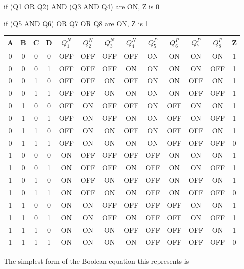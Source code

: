 \documentclass{article}
\begin{document}
\begin{center}
    if (Q1 OR Q2) AND (Q3 AND Q4) are ON, Z is 0
    
    if (Q5 AND Q6) OR Q7 OR Q8 are ON, Z is 1
    
    \vspace{3mm}
    
    \begin{tabular}{c|c|c|c|c|c|c|c|c|c|c|c|c}
        A & B & C & D & $Q_1^N$ & $Q_2^N$ & $Q_3^N$ & $Q_4^N$ & $Q_5^P$ & $Q_6^P$ & $Q_7^P$ & $Q_8^P$ & Z\\ 
        \hline
         0 & 0 & 0 & 0 & OFF & OFF & OFF & OFF & ON  & ON  & ON  & ON  & 1\\
         0 & 0 & 0 & 1 & OFF & OFF & OFF & ON  & ON  & ON  & ON  & OFF & 1\\
         0 & 0 & 1 & 0 & OFF & OFF & ON  & OFF & ON  & ON  & OFF & ON  & 1\\
         0 & 0 & 1 & 1 & OFF & OFF & ON  & ON  & ON  & ON  & OFF & OFF & 1\\
         0 & 1 & 0 & 0 & OFF & ON  & OFF & OFF & ON  & OFF & ON  & ON  & 1\\
         0 & 1 & 0 & 1 & OFF & ON  & OFF & ON  & ON  & OFF & ON  & OFF & 1\\
         0 & 1 & 1 & 0 & OFF & ON  & ON  & OFF & ON  & OFF & OFF & ON  & 1\\
         0 & 1 & 1 & 1 & OFF & ON  & ON  & ON  & ON  & OFF & OFF & OFF & 0\\
         1 & 0 & 0 & 0 & ON  & OFF & OFF & OFF & OFF & ON  & ON  & ON  & 1\\
         1 & 0 & 0 & 1 & ON  & OFF & OFF & ON  & OFF & ON  & ON  & OFF & 1\\
         1 & 0 & 1 & 0 & ON  & OFF & ON  & OFF & OFF & ON  & OFF & ON  & 1\\
         1 & 0 & 1 & 1 & ON  & OFF & ON  & ON  & OFF & ON  & OFF & OFF & 0\\
         1 & 1 & 0 & 0 & ON  & ON  & OFF & OFF & OFF & OFF & ON  & ON  & 1\\ 
         1 & 1 & 0 & 1 & ON  & ON  & OFF & ON  & OFF & OFF & ON  & OFF & 1\\
         1 & 1 & 1 & 0 & ON  & ON  & ON  & OFF & OFF & OFF & OFF & ON  & 1\\
         1 & 1 & 1 & 1 & ON  & ON  & ON  & ON  & OFF & OFF & OFF & OFF & 0\\
    \end{tabular}
    
    \vspace{2mm}
    
    The simplest form of the Boolean equation this represents is  
\end{center}
\newpage
\end{document}
